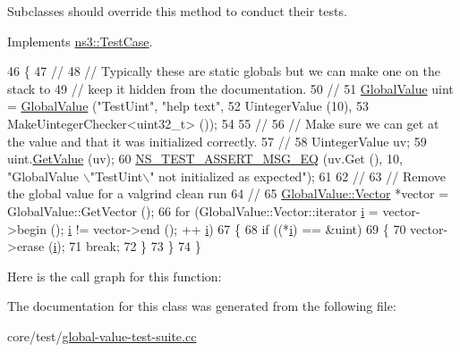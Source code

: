 Subclasses should override this method to conduct their tests. 

Implements \hyperlink{classns3_1_1TestCase_a8ff74680cf017ed42011e4be51917a24}{ns3\+::\+Test\+Case}.


\begin{DoxyCode}
46 \{
47   \textcolor{comment}{//}
48   \textcolor{comment}{// Typically these are static globals but we can make one on the stack to }
49   \textcolor{comment}{// keep it hidden from the documentation.}
50   \textcolor{comment}{//}
51   \hyperlink{classns3_1_1GlobalValue}{GlobalValue} uint = \hyperlink{classns3_1_1GlobalValue}{GlobalValue} (\textcolor{stringliteral}{"TestUint"}, \textcolor{stringliteral}{"help text"},
52                                   UintegerValue (10),
53                                   MakeUintegerChecker<uint32\_t> ());
54 
55   \textcolor{comment}{//}
56   \textcolor{comment}{// Make sure we can get at the value and that it was initialized correctly.}
57   \textcolor{comment}{//}
58   UintegerValue uv;
59   uint.\hyperlink{classns3_1_1GlobalValue_aa33773cb952ba3c285a03ae2c4769b84}{GetValue} (uv);
60   \hyperlink{group__testing_ga2a9d78cffb3db8e867c35fff0b698cf5}{NS\_TEST\_ASSERT\_MSG\_EQ} (uv.Get (), 10, \textcolor{stringliteral}{"GlobalValue \(\backslash\)"TestUint\(\backslash\)" not initialized as
       expected"});
61 
62   \textcolor{comment}{//}
63   \textcolor{comment}{// Remove the global value for a valgrind clean run}
64   \textcolor{comment}{//}
65   \hyperlink{classns3_1_1GlobalValue_a674b6c1d387dc3b62e416c7fff43a4e9}{GlobalValue::Vector} *vector = GlobalValue::GetVector ();
66   \textcolor{keywordflow}{for} (GlobalValue::Vector::iterator \hyperlink{bernuolliDistribution_8m_a6f6ccfcf58b31cb6412107d9d5281426}{i} = vector->begin (); \hyperlink{bernuolliDistribution_8m_a6f6ccfcf58b31cb6412107d9d5281426}{i} != vector->end (); ++
      \hyperlink{bernuolliDistribution_8m_a6f6ccfcf58b31cb6412107d9d5281426}{i})
67     \{
68       \textcolor{keywordflow}{if} ((*\hyperlink{bernuolliDistribution_8m_a6f6ccfcf58b31cb6412107d9d5281426}{i}) == &uint)
69         \{
70           vector->erase (\hyperlink{bernuolliDistribution_8m_a6f6ccfcf58b31cb6412107d9d5281426}{i});
71           \textcolor{keywordflow}{break};
72         \}
73     \}
74 \}
\end{DoxyCode}


Here is the call graph for this function\+:




The documentation for this class was generated from the following file\+:\begin{DoxyCompactItemize}
\item 
core/test/\hyperlink{global-value-test-suite_8cc}{global-\/value-\/test-\/suite.\+cc}\end{DoxyCompactItemize}

